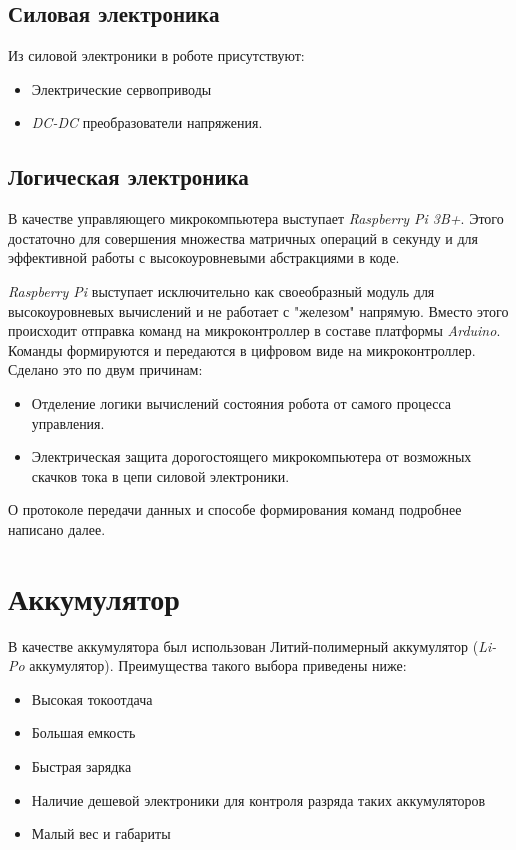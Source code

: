 \subsection{Силовая электроника}
Из силовой электроники в роботе присутствуют:
\begin{itemize}
    \item Электрические сервоприводы
    \item \textit{DC-DC} преобразователи напряжения.
\end{itemize}

\subsection{Логическая электроника}
В качестве управляющего микрокомпьютера выступает \textit{Raspberry Pi 3B+}. Этого достаточно для совершения множества матричных операций в секунду и для эффективной работы с высокоуровневыми абстракциями в коде.

\textit{Raspberry Pi} выступает исключительно как своеобразный модуль для высокоуровневых вычислений и не работает с "железом" напрямую. Вместо этого происходит отправка команд на микроконтроллер в составе платформы \textit{Arduino}. Команды формируются и передаются в цифровом виде на микроконтроллер. Сделано это по двум причинам:
\begin{itemize}
    \item Отделение логики вычислений состояния робота от самого процесса управления.
    \item Электрическая защита дорогостоящего микрокомпьютера от возможных скачков тока в цепи силовой электроники.
\end{itemize}

О протоколе передачи данных и способе формирования команд подробнее написано далее. \fixme

\section{Аккумулятор}
В качестве аккумулятора был использован Литий-полимерный аккумулятор (\textit{Li-Po} аккумулятор). Преимущества такого выбора приведены ниже:
\begin{itemize}
    \item Высокая токоотдача
    \item Большая емкость
    \item Быстрая зарядка
    \item Наличие дешевой электроники для контроля разряда таких аккумуляторов
    \item Малый вес и габариты
\end{itemize}

